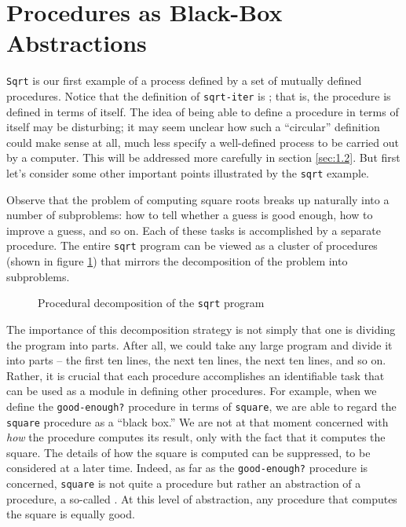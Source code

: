 \section{Procedures as Black-Box Abstractions}
\label{sec:1.1.8}

\texttt{Sqrt} is our first example of a process defined by a set of
mutually defined procedures.  Notice that the definition of
\texttt{sqrt-iter} is ; that is, the procedure is
defined in terms of itself.  The idea of being able to define a
procedure in terms of itself may be disturbing; it may seem unclear
how such a ``circular'' definition could make sense at all, much less
specify a well-defined process to be carried out by a computer.  This
will be addressed more carefully in section \ref{sec:1.2}.  But first
let's consider some other important points illustrated by the
\texttt{sqrt} example.

Observe that the problem of computing square roots breaks up naturally
into a number of subproblems: how to tell whether a guess is good
enough, how to improve a guess, and so on.  Each of these tasks is
accomplished by a separate procedure.  The entire \texttt{sqrt} program
can be viewed as a cluster of procedures (shown in
figure \ref{fig:1.2}) that mirrors the decomposition of
the problem into subproblems.

\begin{figure}
  \caption{Procedural decomposition of the \texttt{sqrt} program}
  \label{fig:1.2}
\end{figure}
          
            
The importance of this decomposition strategy is not simply that one
is dividing the program into parts.  After all, we could take any
large program and divide it into parts -- the first ten lines, the next
ten lines, the next ten lines, and so on.  Rather, it is crucial that
each procedure accomplishes an identifiable task that can be used as a
module in defining other procedures.  For example, when we define the
\texttt{good-enough?} procedure in terms of \texttt{square}, we are able to
regard the \texttt{square} procedure as a ``black box.''  We are not at
that moment concerned with \textit{how} the procedure computes its
result, only with the fact that it computes the square.  The details
of how the square is computed can be suppressed, to be considered at a
later time.  Indeed, as far as the \texttt{good-enough?} procedure is
concerned, \texttt{square} is not quite a procedure but rather an
abstraction of a procedure, a so-called .
At this level of abstraction, any procedure that computes the square
is equally good.

